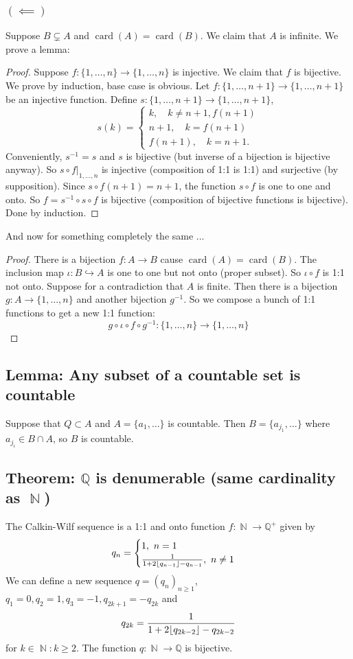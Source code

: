 \documentclass{article}
\DeclareMathOperator\N{\mathbb{N}}
\DeclarePairedDelimiter\floor{\lfloor}{\rfloor}
\DeclareMathOperator\cd{card}
\begin{document}
\subsubsection*{$(\impliedby)$}
Suppose $B \subsetneq A$ and $\cd(A) = \cd(B)$. We claim that $A$ is infinite. We prove a lemma:
\begin{proof}
Suppose $f: \{1,\hdots,n \} \to \{1,\hdots,n \}$ is injective.
We claim that $f$ is bijective. We prove by induction, base case is obvious.
Let $f:\{1,\hdots,n +1 \} \to \{1,\hdots,n +1 \}$ be an injective function.
Define $s:\{1,\hdots,n+1 \} \to \{1,\hdots,n+1 \}$,$$
s(k) = \begin{cases}
k, \quad k \neq n+1,f(n+1) \\
n+1, \quad k = f(n+1) \\
f(n+1), \quad k = n+1.
\end{cases}
$$
Conveniently, $s^{-1} = s$ and $s$ is bijective (but inverse of a bijection is bijective anyway). So $s \circ f \vert_{1,\hdots,n}$ is injective (composition of 1:1 is 1:1)
and surjective (by supposition). Since $s \circ f(n+1) = n+1$, the function $s \circ f$ is one to one and onto.
So $f = s^{-1} \circ s \circ f$ is bijective (composition of bijective functions is bijective). Done by induction.
\end{proof}
\noindent And now for something completely the same ...
\begin{proof}
There is a bijection $f:A \to B$ cause $\cd(A) = \cd(B)$.
The inclusion map $\iota: B \hookrightarrow A$
is one to one but not onto (proper subset). So $\iota \circ f$ is 1:1 not onto. Suppose for a contradiction that $A$
is finite. Then there is a bijection $g:A \to \{1,\hdots,n \}$
and another bijection $g^{-1}$. So we compose a bunch of
1:1 functions to get a new 1:1 function:
$$
g \circ \iota \circ f \circ g^{-1}: \{1,\hdots,n \} \to \{1,\hdots,n \}
$$

\end{proof}
\subsection*{Lemma: Any subset of a countable set is countable}
Suppose that $Q \subset A$ and $A = \{a_1,\hdots \}$ is countable. Then $B = \{ a_{j_1},\hdots \}$ where $a_{j_i} \in B \cap A$, so $B$ is countable.

\subsection*{Theorem: $\mathbb{Q}$ is denumerable (same cardinality as $\N$)}
The Calkin-Wilf sequence is a 1:1 and onto function $f:\N \to \mathbb{Q}^+$ given by $$
q_n = \begin{cases}
1, \,\, n = 1 \\
\frac{1}{1+2\floor*{q_{n-1}} - q_{n-1}}, \,\, n \neq 1
\end{cases}
$$
We can define a new sequence $q = (q_n)_{n \geq 1}$, $q_1 = 0, q_2 = 1, q_3 = -1, q_{2k+1} = -q_{2k}$ and  $$
q_{2k} = \frac{1}{1+2\floor*{q_{2k-2}} - q_{2k-2}}
$$
for $k \in \N: k \geq 2$. The function $q: \N \to \mathbb{Q}$ is bijective.
\end{document}
